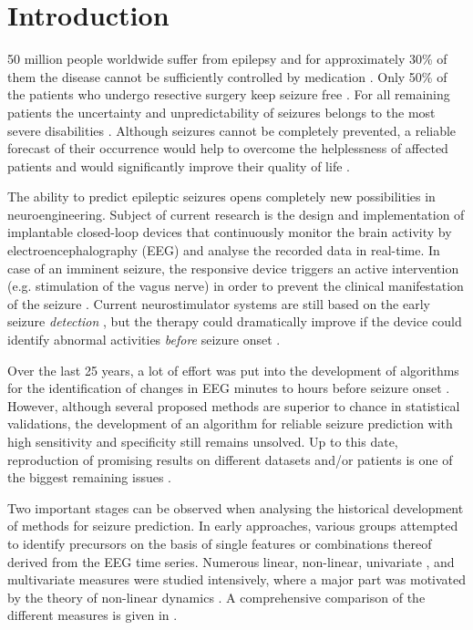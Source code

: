 \documentclass[a4paper, conference]{IEEEtran}
\begin{document}
\IEEEpeerreviewmaketitle

\section{Introduction}
\label{sec:introduction}



50 million people worldwide suffer from epilepsy \cite{Ngugi2010} and for approximately 30\;\% of them the disease cannot be sufficiently controlled by medication \cite{Kwan2000}. Only 50\;\% of the patients who undergo resective surgery keep seizure free \cite{Tisi2011}. For all remaining patients the uncertainty and unpredictability of seizures belongs to the most severe disabilities \cite{Mormann2006, Schulze-Bonhage2008}. Although seizures cannot be completely prevented, a reliable forecast of their occurrence would help to overcome the helplessness of affected patients and would significantly improve their quality of life \cite{Elger2001}.

The ability to predict epileptic seizures opens completely new possibilities in neuroengineering. Subject of current research is the design and implementation of implantable closed-loop devices that continuously monitor the brain activity by electroencephalography (EEG) and analyse the recorded data in real-time. In case of an imminent seizure, the responsive device triggers an active intervention (e.g. stimulation of the vagus nerve) in order to prevent the clinical manifestation of the seizure \cite{Stacey2008}. Current neurostimulator systems are still based on the early seizure \textit{detection} \cite{Bergey2015, Geller2017}, but the therapy could dramatically improve if the device could identify abnormal activities \textit{before} seizure onset \cite{Gadhoumi2016, Nagaraj2015}.

Over the last 25 years, a lot of effort was put into the development of algorithms for the identification of changes in EEG minutes to hours before seizure onset \cite{Gadhoumi2016, Kuhlmann2018a}. However, although several proposed methods are superior to chance in statistical validations, the development of an algorithm for reliable seizure prediction with high sensitivity and specificity still remains unsolved. Up to this date, reproduction of promising results on different datasets and/or patients is one of the biggest remaining issues \cite{Mormann2016}. 

Two important stages can be observed when analysing the historical development of methods for seizure prediction. In early approaches, various groups attempted to identify precursors on the basis of single features or combinations thereof derived from the EEG time series. Numerous linear, non-linear, univariate \cite{Lehnertz1997, LeVanQuyen2008}, and multivariate measures \cite{Krug2007, Senger2016, Tetzlaff2012} were studied intensively, where a major part was motivated by the theory of non-linear dynamics \cite{Lehnertz2008, Mormann2006}. A comprehensive comparison of the different measures is given in \cite{Carney2011}. 
\end{document}
